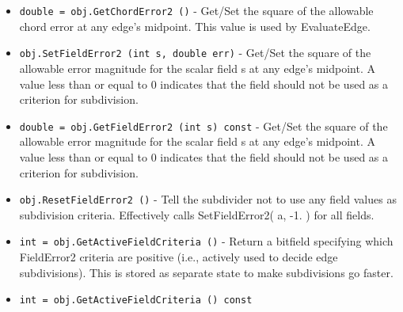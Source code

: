 \begin{itemize}
\item  \verb|double = obj.GetChordError2 ()| -  Get/Set the square of the allowable chord error at any edge's midpoint.
 This value is used by EvaluateEdge.

\item  \verb|obj.SetFieldError2 (int s, double err)| -  Get/Set the square of the allowable error magnitude for the
 scalar field  s at any edge's midpoint.
 A value less than or equal to 0 indicates that the field
 should not be used as a criterion for subdivision.

\item  \verb|double = obj.GetFieldError2 (int s) const| -  Get/Set the square of the allowable error magnitude for the
 scalar field  s at any edge's midpoint.
 A value less than or equal to 0 indicates that the field
 should not be used as a criterion for subdivision.

\item  \verb|obj.ResetFieldError2 ()| -  Tell the subdivider not to use any field values as subdivision criteria.
 Effectively calls SetFieldError2( a, -1. ) for all fields.

\item  \verb|int = obj.GetActiveFieldCriteria ()| -  Return a bitfield specifying which FieldError2 criteria are positive (i.e., actively
 used to decide edge subdivisions).
 This is stored as separate state to make subdivisions go faster.

\item  \verb|int = obj.GetActiveFieldCriteria () const|

\end{itemize}
